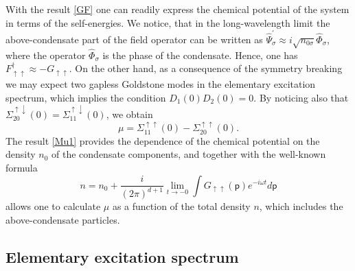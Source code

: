 \documentclass[reprint,superscriptaddress,showpacs,nofootinbib,aps,pra]{revtex4-1}
\begin{document}
With the result \eqref{GF} one can readily express the chemical potential of the system in terms of the self-energies. We notice, that in the long-wavelength limit the above-condensate part of the field operator can be written as $\hat\Psi^\prime_\sigma \approx i \sqrt{n_{0\sigma}} \hat\Phi_\sigma$, where the operator $\hat\Phi_\sigma$ is the phase of the condensate. Hence, one has $F^\dag_{\uparrow \uparrow} \approx -G_{\uparrow\uparrow}$. On the other hand, as a consequence of the symmetry breaking we may expect two gapless Goldstone modes in the elementary excitation spectrum, which implies the condition $D_1(0)D_2(0)=0$. By noticing also that $\Sigma^{\uparrow \downarrow}_{20}(0)= \Sigma^{\uparrow \downarrow}_{11}(0)$, we obtain
\begin{equation}\label{Mu1}
  \mu=\Sigma^{\uparrow \uparrow}_{11}(0) - \Sigma^{\uparrow \uparrow}_{20}(0).
\end{equation}
The result \eqref{Mu1} provides the dependence of the chemical potential on the density $n_0$ of the condensate components, and together with the well-known formula \cite{AGD}
\begin{equation}
\label{depletion}
n=n_0+\frac{i}{(2\pi)^{d+1}}\lim_{{t}\rightarrow{-0}}\int G_{\uparrow\uparrow}(\mathsf p)e^{-i\omega t}d\mathsf p
\end{equation}
allows one to calculate $\mu$ as a function of the total density $n$, which includes the above-condensate particles.

\subsection{Elementary excitation spectrum}
\end{document}
